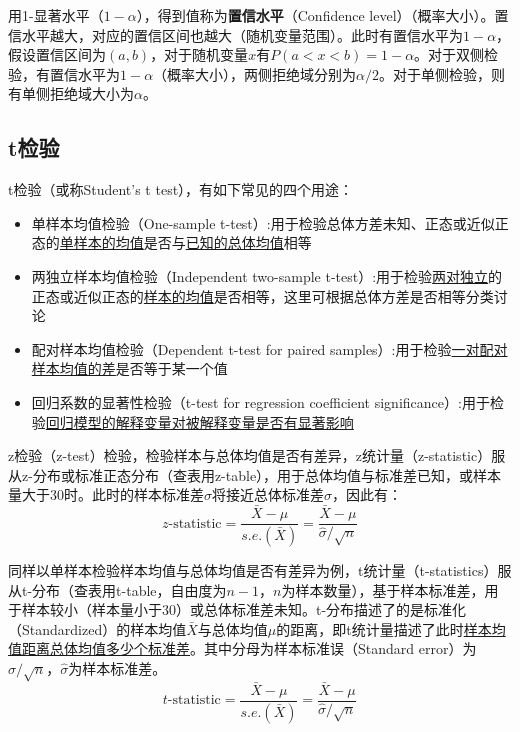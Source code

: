 \documentclass[11pt]{article}
\begin{document}
用1-显著水平（$1-\alpha$），得到值称为\textbf{置信水平}（Confidence level）（概率大小）。置信水平越大，对应的置信区间也越大（随机变量范围）。此时有置信水平为$1-\alpha$，假设置信区间为$(a,b)$，对于随机变量$x$有$P(a<x<b)=1-\alpha$。对于双侧检验，有置信水平为$1-\alpha$（概率大小），两侧拒绝域分别为$\alpha/2$。对于单侧检验，则有单侧拒绝域大小为$\alpha$。

\subsection{t检验}

t检验（或称Student's t test），有如下常见的四个用途：
\begin{itemize}
    \item 单样本均值检验（One-sample t-test）:用于检验总体方差未知、正态或近似正态的\uline{单样本的均值}是否与\uline{已知的总体均值}相等
    \item 两独立样本均值检验（Independent two-sample t-test）:用于检验\uline{两对独立}的正态或近似正态的\uline{样本的均值}是否相等，这里可根据总体方差是否相等分类讨论
    \item 配对样本均值检验（Dependent t-test for paired samples）:用于检验\uline{一对配对样本均值的差}是否等于某一个值
    \item 回归系数的显著性检验（t-test for regression coefficient significance）:用于检验\uline{回归模型的解释变量对被解释变量是否有显著影响}
\end{itemize}

z检验（z-test）检验，检验样本与总体均值是否有差异，z统计量（z-statistic）服从z-分布或标准正态分布（查表用z-table），用于总体均值与标准差已知，或样本量大于30时。此时的样本标准差$\hat{\sigma}$将接近总体标准差$\sigma$，因此有：
\begin{equation*}
    z\text{-statistic} = \frac{\bar{X}-\mu}{s.e.(\bar{X})} = \frac{\bar{X} - \mu}{\hat{\sigma}/\sqrt{n}}
\end{equation*}

同样以单样本检验样本均值与总体均值是否有差异为例，t统计量（t-statistics）服从t-分布（查表用t-table，自由度为$n-1$，$n$为样本数量），基于样本标准差，用于样本较小（样本量小于30）或总体标准差未知。t-分布描述了的是标准化（Standardized）的样本均值$\bar{X}$与总体均值$\mu$的距离，即t统计量描述了此时\uline{样本均值距离总体均值多少个标准差}。其中分母为样本标准误（Standard error）为$\sigma/\sqrt{n}$，$\hat{\sigma}$为样本标准差。
\begin{equation*}
    t\text{-statistic} = \frac{\bar{X}-\mu}{s.e.(\bar{X})} = \frac{\bar{X}-\mu}{\hat{\sigma}/\sqrt{n}}
\end{equation*}
\end{document}
